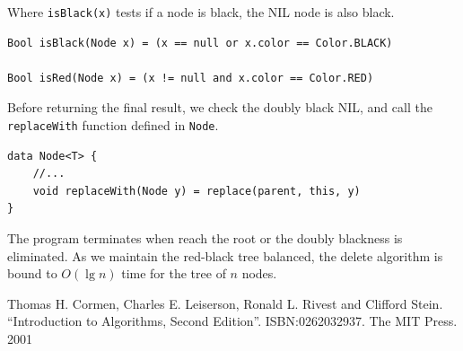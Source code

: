 \documentclass[b5paper]{article}
\begin{document}
Where \texttt{isBlack(x)} tests if a node is black, the NIL node is also black.

\begin{lstlisting}[language = Bourbaki]
Bool isBlack(Node x) = (x == null or x.color == Color.BLACK)

Bool isRed(Node x) = (x != null and x.color == Color.RED)
\end{lstlisting}

Before returning the final result, we check the doubly black NIL, and call the \texttt{replaceWith} function defined in \texttt{Node}.

\begin{lstlisting}[language = Bourbaki]
data Node<T> {
    //...
    void replaceWith(Node y) = replace(parent, this, y)
}
\end{lstlisting}

The program terminates when reach the root or the doubly blackness is eliminated. As we maintain the red-black tree balanced, the delete algorithm is bound to $O(\lg n)$ time for the tree of $n$ nodes.


\ifx\wholebook\relax \else

\begin{thebibliography}{99}

Thomas H. Cormen, Charles E. Leiserson, Ronald L. Rivest and Clifford Stein.
``Introduction to Algorithms, Second Edition''. ISBN:0262032937. The MIT Press. 2001

\end{thebibliography}

\expandafter\enddocument
\fi
\end{document}
